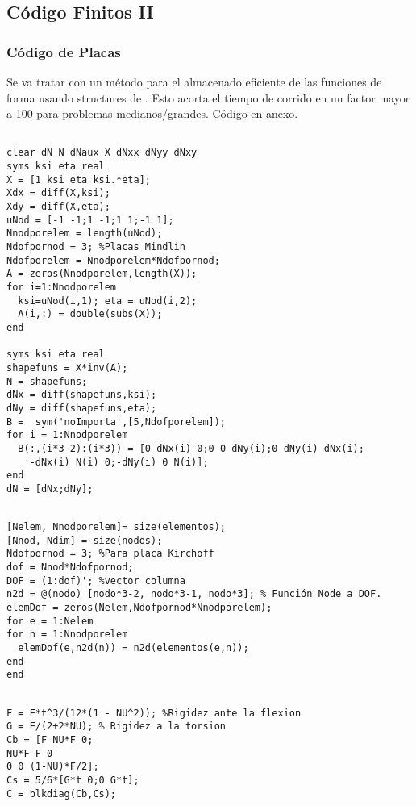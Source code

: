  \clearpage
 \subsection*{Código \Matlab{} Finitos II}
    \subsubsection*{Código de Placas}
    Se va tratar con un método para el almacenado eficiente de las funciones de forma usando structures de \Matlab{}. Esto acorta el tiempo de corrido en un factor mayor a 100 para problemas medianos/grandes. Código en anexo.

    \begin{code}
    \begin{verbatim}

clear dN N dNaux X dNxx dNyy dNxy 
syms ksi eta real
X = [1 ksi eta ksi.*eta];
Xdx = diff(X,ksi);
Xdy = diff(X,eta);
uNod = [-1 -1;1 -1;1 1;-1 1];
Nnodporelem = length(uNod);
Ndofpornod = 3; %Placas Mindlin
Ndofporelem = Nnodporelem*Ndofpornod;
A = zeros(Nnodporelem,length(X));
for i=1:Nnodporelem
  ksi=uNod(i,1); eta = uNod(i,2);
  A(i,:) = double(subs(X));
end

syms ksi eta real
shapefuns = X*inv(A);
N = shapefuns;
dNx = diff(shapefuns,ksi);
dNy = diff(shapefuns,eta);
B =  sym('noImporta',[5,Ndofporelem]);
for i = 1:Nnodporelem
  B(:,(i*3-2):(i*3)) = [0 dNx(i) 0;0 0 dNy(i);0 dNy(i) dNx(i);
	-dNx(i) N(i) 0;-dNy(i) 0 N(i)];
end
dN = [dNx;dNy];
    \end{verbatim}
    \end{code}




\begin{code}
	\begin{verbatim}

[Nelem, Nnodporelem]= size(elementos);  
[Nnod, Ndim] = size(nodos);
Ndofpornod = 3; %Para placa Kirchoff
dof = Nnod*Ndofpornod;
DOF = (1:dof)'; %vector columna
n2d = @(nodo) [nodo*3-2, nodo*3-1, nodo*3]; % Función Node a DOF.
elemDof = zeros(Nelem,Ndofpornod*Nnodporelem);
for e = 1:Nelem
for n = 1:Nnodporelem
  elemDof(e,n2d(n)) = n2d(elementos(e,n));
end
end
	\end{verbatim}
\end{code}

\begin{code}[Constitutiva]
	\begin{verbatim}
	
F = E*t^3/(12*(1 - NU^2)); %Rigidez ante la flexion
G = E/(2+2*NU); % Rigidez a la torsion
Cb = [F NU*F 0;
NU*F F 0 
0 0 (1-NU)*F/2];
Cs = 5/6*[G*t 0;0 G*t];
C = blkdiag(Cb,Cs);
	\end{verbatim}
\end{code}

